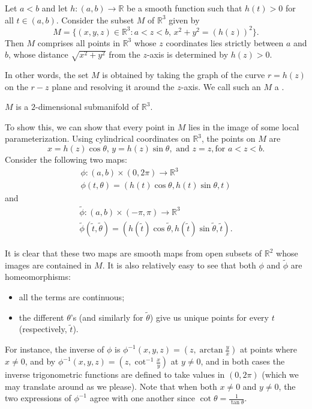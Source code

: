 \documentclass[notoc,notitlepage]{tufte-book}
\begin{document}
\begin{eg}\label{eg:parameterization_of_a_torus_in_r_n_no1}
  Let $a < b$ and let $h : (a, b) \to \mathbb{R}$ be a smooth function such that
  $h(t) > 0$ for all $t \in (a, b)$. Consider the subset $M$ of $\mathbb{R}^3$
  given by
  \begin{equation*}
    M = \{ (x, y, z) \in \mathbb{R}^3 : a < z < b, \, x^2 + y^2 = (h(z))^2 \}.
  \end{equation*}
  Then $M$ comprises all points in $\mathbb{R}^3$ whose $z$ coordinates lies
  strictly between $a$ and $b$, whose distance $\sqrt{x^2 + y^2}$ from the
  $z$-axis is determined by $h(z) > 0$.

  In other words, the set $M$ is obtained by taking the graph of the curve $r =
  h(z)$ on the $r-z$ plane and resolving it around the $z$-axis. We call such an
  $M$ a . 
  
   $M$ is a $2$-dimensional submanifold of $\mathbb{R}^3$.

  To show this, we can show that every point in $M$ lies in the image of some
  local parameterization. Using cylindrical coordinates on $\mathbb{R}^3$, the
  points on $M$ are
  \begin{equation*}
    x = h(z) \cos \theta, \, y = h(z) \sin \theta, \text{ and } z = z, \text{
    for } a < z < b.
  \end{equation*}
  Consider the following two maps:
  \begin{gather*}
    \phi : (a, b) \times (0, 2 \pi) \to \mathbb{R}^3 \\
    \phi(t, \theta) = (h(t) \cos \theta, h(t) \sin \theta, t)
  \end{gather*}
  and
  \begin{gather*}
    \tilde{\phi} : (a, b) \times (- \pi, \pi) \to \mathbb{R}^3 \\
    \tilde{\phi}(\tilde{t}, \tilde{\theta}) = (h(\tilde{t}) \cos \tilde{\theta},
    h(\tilde{t}) \sin \tilde{\theta}, \tilde{t}).
  \end{gather*}
\end{eg}
It is clear that these two maps are smooth maps from open subsets of
$\mathbb{R}^2$ whose images are contained in $M$. It is also relatively easy to
see that both $\phi$ and $\tilde{\phi}$ are homeomorphisms:
\begin{itemize}
  \item all the terms are continuous;
  \item the different $\theta$'s (and similarly for $\tilde{\theta}$) give us
    unique points for every $t$ (respectively, $\tilde{t}$).
\end{itemize}
For instance, the inverse of $\phi$ is $\phi^{-1}(x, y, z) = \left(z, \arctan
\frac{y}{x}\right)$ at points where $x \neq 0$, and by $\phi^{-1}(x, y, z) = \left(z,
\cot^{-1} \frac{x}{y}\right)$ at $y \neq 0$, and in both cases the inverse
trigonometric functions are defined to take values in $(0, 2 \pi)$ (which we may
translate around as we please). Note that when both $x \neq 0$ and $y \neq 0$,
the two expressions of $\phi^{-1}$ agree with one another since $\cot \theta =
\frac{1}{\tan \theta}$.
\end{document}
